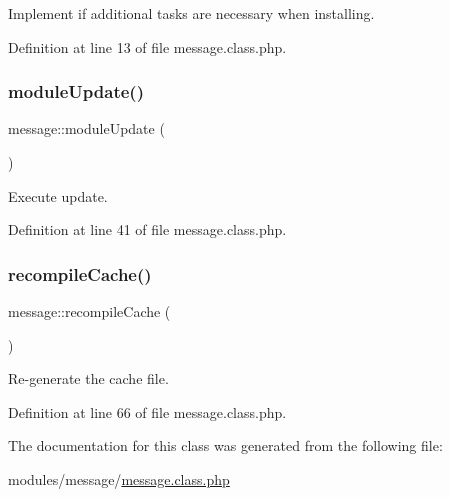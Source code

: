 Implement if additional tasks are necessary when installing. 



Definition at line 13 of file message.\+class.\+php.

\hypertarget{classmessage_ad57e7bdf84c463626454a18ead0ff1ce}{}\label{classmessage_ad57e7bdf84c463626454a18ead0ff1ce} 
\subsubsection{\texorpdfstring{module\+Update()}{moduleUpdate()}}
{\footnotesize\ttfamily message\+::module\+Update (\begin{DoxyParamCaption}{ }\end{DoxyParamCaption})}



Execute update. 



Definition at line 41 of file message.\+class.\+php.

\hypertarget{classmessage_afb564d4a4be415199786f368e9d6a243}{}\label{classmessage_afb564d4a4be415199786f368e9d6a243} 
\subsubsection{\texorpdfstring{recompile\+Cache()}{recompileCache()}}
{\footnotesize\ttfamily message\+::recompile\+Cache (\begin{DoxyParamCaption}{ }\end{DoxyParamCaption})}



Re-\/generate the cache file. 



Definition at line 66 of file message.\+class.\+php.



The documentation for this class was generated from the following file\+:\begin{DoxyCompactItemize}
\item 
modules/message/\hyperlink{message_8class_8php}{message.\+class.\+php}\end{DoxyCompactItemize}
